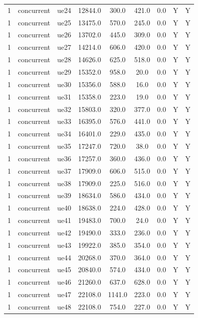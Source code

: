 \begin{table}[ht]
\begin{tabular}{|c|c|c|c|c|c|c|c|c|}
1 & concurrent & ue24 & 12844.0 & 300.0 & 421.0 & 0.0 & Y & Y \\
1 & concurrent & ue25 & 13475.0 & 570.0 & 245.0 & 0.0 & Y & Y \\
1 & concurrent & ue26 & 13702.0 & 445.0 & 309.0 & 0.0 & Y & Y \\
1 & concurrent & ue27 & 14214.0 & 606.0 & 420.0 & 0.0 & Y & Y \\
1 & concurrent & ue28 & 14626.0 & 625.0 & 518.0 & 0.0 & Y & Y \\
1 & concurrent & ue29 & 15352.0 & 958.0 & 20.0 & 0.0 & Y & Y \\
1 & concurrent & ue30 & 15356.0 & 588.0 & 16.0 & 0.0 & Y & Y \\
1 & concurrent & ue31 & 15358.0 & 223.0 & 19.0 & 0.0 & Y & Y \\
1 & concurrent & ue32 & 15803.0 & 320.0 & 377.0 & 0.0 & Y & Y \\
1 & concurrent & ue33 & 16395.0 & 576.0 & 441.0 & 0.0 & Y & Y \\
1 & concurrent & ue34 & 16401.0 & 229.0 & 435.0 & 0.0 & Y & Y \\
1 & concurrent & ue35 & 17247.0 & 720.0 & 38.0 & 0.0 & Y & Y \\
1 & concurrent & ue36 & 17257.0 & 360.0 & 436.0 & 0.0 & Y & Y \\
1 & concurrent & ue37 & 17909.0 & 606.0 & 515.0 & 0.0 & Y & Y \\
1 & concurrent & ue38 & 17909.0 & 225.0 & 516.0 & 0.0 & Y & Y \\
1 & concurrent & ue39 & 18634.0 & 586.0 & 434.0 & 0.0 & Y & Y \\
1 & concurrent & ue40 & 18638.0 & 224.0 & 428.0 & 0.0 & Y & Y \\
1 & concurrent & ue41 & 19483.0 & 700.0 & 24.0 & 0.0 & Y & Y \\
1 & concurrent & ue42 & 19490.0 & 333.0 & 236.0 & 0.0 & Y & Y \\
1 & concurrent & ue43 & 19922.0 & 385.0 & 354.0 & 0.0 & Y & Y \\
1 & concurrent & ue44 & 20268.0 & 370.0 & 364.0 & 0.0 & Y & Y \\
1 & concurrent & ue45 & 20840.0 & 574.0 & 434.0 & 0.0 & Y & Y \\
1 & concurrent & ue46 & 21260.0 & 637.0 & 628.0 & 0.0 & Y & Y \\
1 & concurrent & ue47 & 22108.0 & 1141.0 & 223.0 & 0.0 & Y & Y \\
1 & concurrent & ue48 & 22108.0 & 754.0 & 227.0 & 0.0 & Y & Y \\

\end{tabular}
\end{table}
